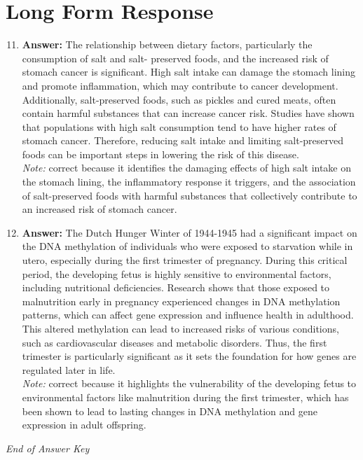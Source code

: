 \documentclass[12pt]{article}
\begin{document}
\section*{Long Form Response}
\begin{enumerate}[label=\arabic*.]
\setcounter{enumi}{10}
\item \textbf{Answer:} The relationship between dietary factors, particularly the consumption of salt and salt- preserved foods, and the increased risk of stomach cancer is significant. High salt intake can damage the stomach lining and promote inflammation, which may contribute to cancer development. Additionally, salt-preserved foods, such as pickles and cured meats, often contain harmful substances that can increase cancer risk. Studies have shown that populations with high salt consumption tend to have higher rates of stomach cancer. Therefore, reducing salt intake and limiting salt-preserved foods can be important steps in lowering the risk of this disease.
\\ \textit{Note:} correct because it identifies the damaging effects of high salt intake on the stomach lining, the inflammatory response it triggers, and the association of salt-preserved foods with harmful substances that collectively contribute to an increased risk of stomach cancer.
\item \textbf{Answer:} The Dutch Hunger Winter of 1944-1945 had a significant impact on the DNA methylation of individuals who were exposed to starvation while in utero, especially during the first trimester of pregnancy. During this critical period, the developing fetus is highly sensitive to environmental factors, including nutritional deficiencies. Research shows that those exposed to malnutrition early in pregnancy experienced changes in DNA methylation patterns, which can affect gene expression and influence health in adulthood. This altered methylation can lead to increased risks of various conditions, such as cardiovascular diseases and metabolic disorders. Thus, the first trimester is particularly significant as it sets the foundation for how genes are regulated later in life.
\\ \textit{Note:} correct because it highlights the vulnerability of the developing fetus to environmental factors like malnutrition during the first trimester, which has been shown to lead to lasting changes in DNA methylation and gene expression in adult offspring.
\end{enumerate}

\vfill
\noindent\textit{End of Answer Key}
\end{document}
